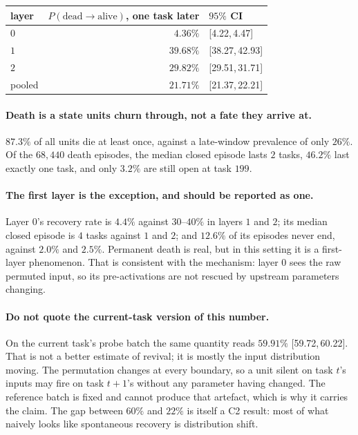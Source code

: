 \documentclass[10pt]{article}
\newcommand{\ci}[2]{{\footnotesize[#1,\,#2]}}
\begin{document}
\begin{center}
\small
\begin{tabular}{@{}l r l@{}}
\toprule
layer & $P(\text{dead} \to \text{alive})$, one task later & $95\%$ CI \\
\midrule
$0$ & $4.36\%$ & \ci{4.22}{4.47} \\
$1$ & $39.68\%$ & \ci{38.27}{42.93} \\
$2$ & $29.82\%$ & \ci{29.51}{31.71} \\
\midrule
pooled & $\mathbf{21.71\%}$ & \ci{21.37}{22.21} \\
\bottomrule
\end{tabular}
\end{center}

\paragraph{Death is a state units churn through, not a fate they arrive at.}
$87.3\%$ of all units die at least once, against a late-window prevalence of
only $26\%$. Of the $68{,}440$ death episodes, the median closed episode lasts
$2$ tasks, $46.2\%$ last exactly one task, and only $3.2\%$ are still open at
task $199$.

\paragraph{The first layer is the exception, and should be reported as one.}
Layer $0$'s recovery rate is $4.4\%$ against $30$--$40\%$ in layers $1$ and $2$;
its median closed episode is $4$ tasks against $1$ and $2$; and $12.6\%$ of its
episodes never end, against $2.0\%$ and $2.5\%$. Permanent death is real, but in
this setting it is a first-layer phenomenon. That is consistent with the
mechanism: layer $0$ sees the raw permuted input, so its pre-activations are not
rescued by upstream parameters changing.

\paragraph{Do not quote the current-task version of this number.}
On the current task's probe batch the same quantity reads $59.91\%$
\ci{59.72}{60.22}. That is not a better estimate of revival; it is mostly the
input distribution moving. The permutation changes at every boundary, so a unit
silent on task $t$'s inputs may fire on task $t{+}1$'s without any parameter
having changed. The reference batch is fixed and cannot produce that artefact,
which is why it carries the claim. The gap between $60\%$ and $22\%$ is itself a
C2 result: most of what naively looks like spontaneous recovery is
distribution shift.
\end{document}
